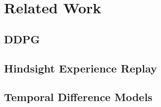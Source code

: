 \section{Related Work}


\subsection{DDPG}


\subsection{Hindsight Experience Replay}


\subsection{Temporal Difference Models}
